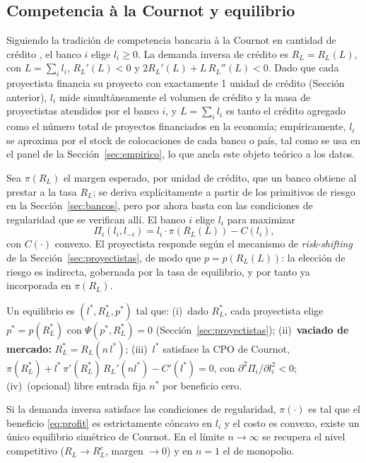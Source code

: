 \subsection{Competencia à la Cournot y equilibrio}\label{sec:cournot}
Siguiendo la tradición de competencia bancaria à la Cournot en cantidad de crédito
\citep{MMR2010,Vives2016}, el banco $i$ elige $l_i\ge 0$. La demanda inversa de crédito es
$R_L=R_L(L)$, con $L=\sum_i l_i$, $R_L'(L)<0$ y $2R_L'(L)+L\,R_L''(L)<0$. Dado que cada
proyectista financia su proyecto con exactamente 1 unidad de crédito (Sección anterior), $l_i$
mide simultáneamente el volumen de crédito y la masa de proyectistas atendidos por el banco
$i$, y $L=\sum_i l_i$ es tanto el crédito agregado como el número total de proyectos
financiados en la economía; empíricamente, $l_i$ se aproxima por el stock de colocaciones de
cada banco o país, tal como se usa en el panel de la Sección~\ref{sec:empirico}, lo que ancla
este objeto teórico a los datos.

Sea $\pi(R_L)$ el margen esperado, por unidad de crédito, que un banco obtiene al prestar a la
tasa $R_L$; se deriva explícitamente a partir de los primitivos de riesgo en la
Sección~\ref{sec:bancos}, pero por ahora basta con las condiciones de regularidad que se
verifican allí. El banco $i$ elige $l_i$ para maximizar
\begin{equation}
\Pi_i(l_i,l_{-i})=l_i\cdot\pi(R_L(L))-C(l_i),
\label{eq:profit}
\end{equation}
con $C(\cdot)$ convexo. El proyectista responde según el mecanismo de \textit{risk-shifting} de
la Sección~\ref{sec:proyectistas}, de modo que $p=p(R_L(L))$: la elección de riesgo es
indirecta, gobernada por la tasa de equilibrio, y por tanto ya incorporada en $\pi(R_L)$.

\begin{definition}\label{def:eq}
Un equilibrio es $(l^*,R_L^*,p^*)$ tal que: (i)~dado $R_L^*$, cada proyectista elige
$p^*=p(R_L^*)$ con $\Psi(p^*,R_L^*)=0$ (Sección~\ref{sec:proyectistas}); (ii)~\textbf{vaciado de
mercado:} $R_L^*=R_L(n\,l^*)$; (iii)~$l^*$ satisface la CPO de Cournot,
$\pi(R_L^*)+l^*\,\pi'(R_L^*)\,R_L'(n l^*)-C'(l^*)=0$, con $\partial^2\Pi_i/\partial l_i^2<0$;
(iv)~(opcional) libre entrada fija $n^*$ por beneficio cero.
\end{definition}

\begin{proposition}\label{prop:exist}
Si la demanda inversa satisface las condiciones de regularidad, $\pi(\cdot)$ es tal que el
beneficio \eqref{eq:profit} es estrictamente cóncavo en $l_i$ y el costo es convexo, existe un
único equilibrio simétrico de Cournot. En el límite $n\to\infty$ se recupera el nivel
competitivo ($R_L\to R_L^c$, margen $\to 0$) y en $n=1$ el de monopolio.
\end{proposition}

